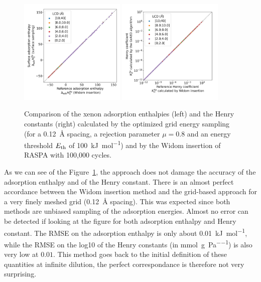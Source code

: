 \documentclass[main]{subfiles}
\begin{document}

\begin{figure}[ht]
  \centering
    \includegraphics[width=0.45\textwidth]{figures/3-fastsim/H_Xe_widom_vs_H_Xe_grid_overview.jpg}
    \includegraphics[width=0.45\textwidth]{figures/3-fastsim/K_Xe_widom_vs_K_Xe_grid_overview.jpg}
    \caption{Comparison of the xenon adsorption enthalpies (left) and the Henry constants (right) calculated by the optimized grid energy sampling (for a \SI{0.12}{\angstrom} spacing, a rejection parameter $\mu=0.8$ and an energy threshold $E_{\text{th}}$ of \SI{100}{\kilo\joule\per\mole}) and by the Widom insertion of RASPA with 100,000 cycles. }\label{fgr:grid_widom}
\end{figure}

As we can see of the Figure~\ref{fgr:grid_widom}, the approach does not damage the accuracy of the adsorption enthalpy and of the Henry constant. There is an almost perfect accordance between the Widom insertion method and the grid-based approach for a very finely meshed grid (\SI{0.12}{\angstrom} spacing). This was expected since both methods are unbiased sampling of the adsorption energies. Almost no error can be detected if looking at the figure for both adsorption enthalpy and Henry constant. The RMSE on the adsorption enthalpy is only about \SI{0.01}{\kilo\joule\per\mole}, while the RMSE on the log10 of the Henry constants (in \si{\milli\mole\per\gram\per\pascal}) is also very low at $0.01$. This method goes back to the initial definition of these quantities at infinite dilution, the perfect correspondance is therefore not very surprising. 
\end{document}
